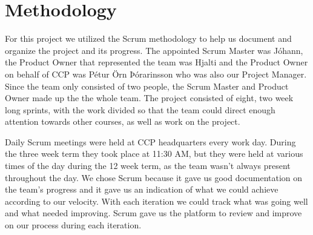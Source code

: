 \section{Methodology}\label{methodology}
For this project we utilized the Scrum methodology to help us document and organize the project and its progress. The appointed Scrum Master was Jóhann, the Product Owner that represented the team was Hjalti and the Product Owner on behalf of CCP was Pétur Örn Þórarinsson who was also our Project Manager. Since the team only consisted of two people, the Scrum Master and Product Owner made up the the whole team. The project consisted of eight, two week long sprints, with the work divided so that the team could direct enough attention towards other courses, as well as work on the project.

Daily Scrum meetings were held at CCP headquarters every work day. During the three week term they took place at 11:30 AM, but they were held at various times of the day during the 12 week term, as the team wasn't always present throughout the day. We chose Scrum because it gave us good documentation on the team's progress and it gave us an indication of what we could achieve according to our velocity. With each iteration we could track what was going well and what needed improving. Scrum gave us the platform to review and improve on our process during each iteration.